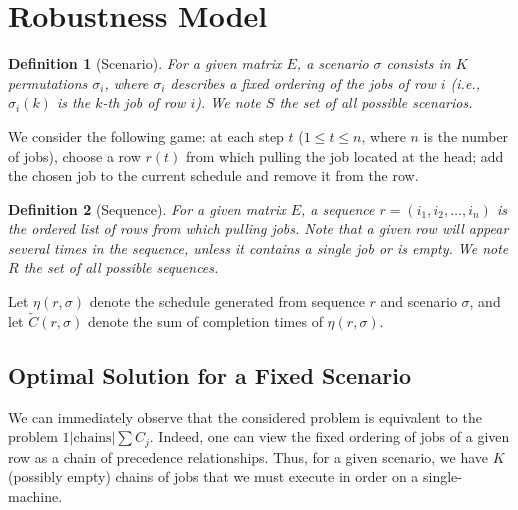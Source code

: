 \documentclass{article}
\newtheorem{definition}{Definition}
\begin{document}
\newpage

\section{Robustness Model}

\begin{definition}[Scenario]
    For a given matrix \(E\), a scenario \(\sigma\) consists in \(K\) permutations \(\sigma_i\), where \(\sigma_i\) describes a fixed ordering of the jobs of row \(i\) (i.e., \(\sigma_i(k)\) is the \(k\)-th job of row \(i\)).
    We note \(S\) the set of all possible scenarios.
\end{definition}

We consider the following game: at each step \(t\) (\(1\le t\le n\), where \(n\) is the number of jobs), choose a row \(r(t)\) from which pulling the job located at the head; add the chosen job to the current schedule and remove it from the row.

\begin{definition}[Sequence]
    For a given matrix \(E\), a sequence \(r=(i_1,i_2,\ldots,i_n)\) is the ordered list of rows from which pulling jobs.
    Note that a given row will appear several times in the sequence, unless it contains a single job or is empty.
    We note \(R\) the set of all possible sequences.
\end{definition}


Let \(\eta(r,\sigma)\) denote the schedule generated from sequence \(r\) and scenario \(\sigma\), and let \(\tilde{C}(r,\sigma)\) denote the sum of completion times of \(\eta(r,\sigma)\).

\subsection{Optimal Solution for a Fixed Scenario}

We can immediately observe that the considered problem is equivalent to the problem \(1|\text{chains}|\sum C_j\).
Indeed, one can view the fixed ordering of jobs of a given row as a chain of precedence relationships.
Thus, for a given scenario, we have \(K\) (possibly empty) chains of jobs that we must execute in order on a single-machine.
\end{document}

